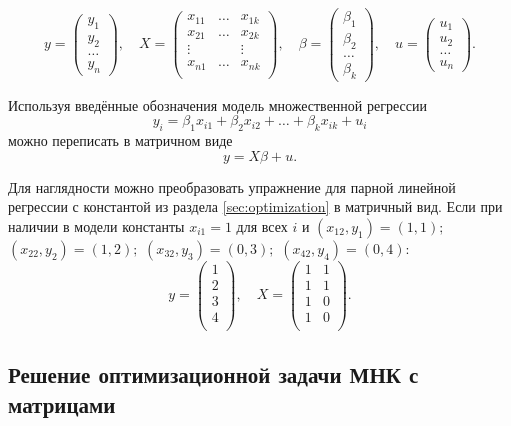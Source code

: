 \documentclass[12pt]{article}
\begin{document}
\[
y =  \begin{pmatrix}
y_1 \\
y_2 \\
\dots \\
y_n
 \end{pmatrix},\quad
X = \begin{pmatrix}
    x_{11} & \dots & x_{1k} \\
    x_{21} & \dots & x_{2k} \\
    \vdots &   & \vdots \\
    x_{n1} & \dots & x_{nk} \\
\end{pmatrix}, \quad
\beta = \begin{pmatrix}
    \beta_1\\
    \beta_2\\
    \dots \\
    \beta_k
\end{pmatrix}, \quad
u =  \begin{pmatrix}
u_1 \\
u_2 \\
\dots \\
u_n
 \end{pmatrix}.
\]

Используя введённые обозначения модель множественной регрессии
\[
y_i = \beta_1 x_{i1} + \beta_2 x_{i2} + \dots + \beta_k x_{ik} + u_i
\]
можно переписать в матричном виде
\[
y = X\beta + u.
\]

Для наглядности можно преобразовать упражнение для парной линейной регрессии с константой из раздела \ref{sec:optimization} в матричный вид. Если при наличии в модели константы $x_{i1} = 1$ для всех $i$ и $(x_{12}, y_1) = (1, 1);$ $(x_{22}, y_2) = (1, 2);$ $(x_{32}, y_3) = (0, 3);$ $(x_{42}, y_4) = (0, 4)$: 
\[
y = \begin{pmatrix}
    1 \\
    2 \\
    3 \\
    4 \\
\end{pmatrix}, \quad 
X = \begin{pmatrix}
    1 & 1 \\
    1 & 1 \\
    1 & 0 \\
    1 & 0 \\
\end{pmatrix}.
\]

\subsection{Решение оптимизационной задачи МНК с матрицами}
\end{document}
